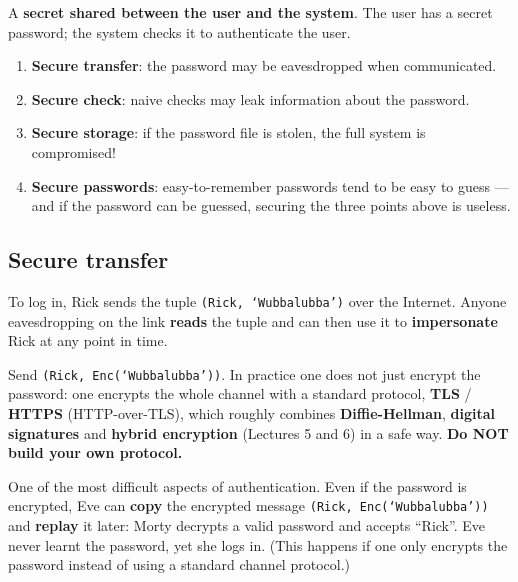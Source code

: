 \begin{defnbox}[title=Password]
A \textbf{secret shared between the user and the system}. The user has a secret password; the
system checks it to authenticate the user.
\end{defnbox}

\begin{keybox}[title=The four problems to be solved]
\begin{enumerate}
  \item \textbf{Secure transfer}: the password may be eavesdropped when communicated.
  \item \textbf{Secure check}: naive checks may leak information about the password.
  \item \textbf{Secure storage}: if the password file is stolen, the full system is compromised!
  \item \textbf{Secure passwords}: easy-to-remember passwords tend to be easy to guess --- and
        if the password can be guessed, securing the three points above is useless.
\end{enumerate}
\end{keybox}

\subsection{Secure transfer}

\begin{defnbox}[title=Sending the password in the clear]
To log in, Rick sends the tuple \texttt{(Rick, `Wubbalubba')} over the Internet. Anyone
eavesdropping on the link \textbf{reads} the tuple and can then use it to \textbf{impersonate}
Rick at any point in time.
\end{defnbox}

\begin{propbox}[title=Encrypt the channel]
Send \texttt{(Rick, Enc(`Wubbalubba'))}. In practice one does not just encrypt the password: one
encrypts the whole channel with a standard protocol, \textbf{TLS} / \textbf{HTTPS}
(HTTP-over-TLS), which roughly combines \textbf{Diffie-Hellman}, \textbf{digital signatures} and
\textbf{hybrid encryption} (Lectures 5 and 6) in a safe way. \textbf{Do NOT build your own
protocol.}
\end{propbox}

\begin{warnbox}[title=Beware of replay attacks]
One of the most difficult aspects of authentication. Even if the password is encrypted, Eve can
\textbf{copy} the encrypted message \texttt{(Rick, Enc(`Wubbalubba'))} and \textbf{replay} it
later: Morty decrypts a valid password and accepts ``Rick''. Eve never learnt the password, yet
she logs in. (This happens if one only encrypts the password instead of using a standard channel
protocol.)
\end{warnbox}

